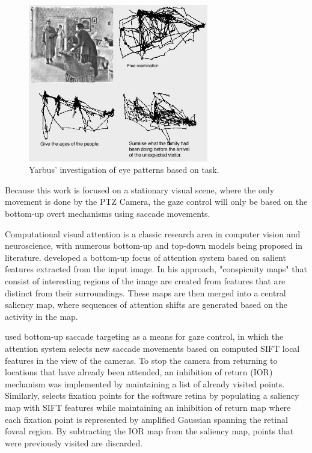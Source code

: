 \documentclass{l4proj}
\begin{document}
\begin{figure}[ht]
    \centering
    \includegraphics[width=0.7\textwidth]{l4template-master/images/Yarbus_The_Visitor.jpg}
    \caption{Yarbus' investigation of eye patterns based on task.}
    \label{Yarbus}
\end{figure}





Because this work is focused on a stationary visual scene, where the only movement is done by the PTZ Camera, the gaze control will only be based on the bottom-up overt mechanisms using saccade movements.


Computational visual attention is a classic research area in computer vision and neuroscience, with numerous bottom-up and top-down models being proposed in literature. \citet{milanese1992} developed a bottom-up focus of attention system based on salient features extracted from the input image. In his approach, "conspicuity maps" that consist of interesting regions of the image are created from features that are distinct from their surroundings. These maps are then merged into a central saliency map, where sequences of attention shifts are generated based on the activity in the map. 

\citet{Fattah} used bottom-up saccade targeting as a means for gaze control, in which the attention system selects new saccade movements based on computed SIFT local features in the view of the cameras. To stop the camera from returning to locations that have already been attended, an inhibition of return (IOR) mechanism was implemented by maintaining a list of already  visited points. Similarly, \citet{Ozimek} selects fixation points for the software retina by populating a saliency map with SIFT features while maintaining an inhibition of return map where each fixation point is represented by amplified Gaussian spanning the retinal foveal region. By subtracting the IOR map from the saliency map, points that were previously visited are discarded. 
\end{document}
